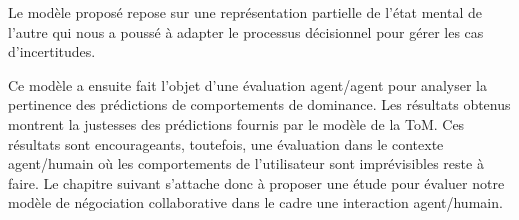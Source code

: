 	Le modèle proposé repose sur une représentation partielle de l'état mental de l'autre qui nous a poussé à adapter le processus décisionnel pour gérer les cas d'incertitudes. 
	
	Ce modèle a ensuite fait l'objet d'une évaluation agent/agent pour analyser la pertinence des prédictions de comportements de dominance. Les résultats obtenus montrent la justesses des prédictions fournis par le modèle de la ToM. Ces résultats sont encourageants, toutefois, une évaluation dans le contexte agent/humain où les comportements de l'utilisateur sont imprévisibles reste à faire. Le chapitre suivant s'attache donc à proposer une étude pour évaluer notre modèle de négociation collaborative dans le cadre une interaction agent/humain.
	
	
